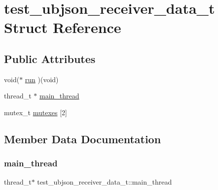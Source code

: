 \hypertarget{structtest__ubjson__receiver__data__t}{}\section{test\+\_\+ubjson\+\_\+receiver\+\_\+data\+\_\+t Struct Reference}
\label{structtest__ubjson__receiver__data__t}
\subsection*{Public Attributes}
\begin{DoxyCompactItemize}
\item 
void($\ast$ \hyperlink{structtest__ubjson__receiver__data__t_a1a3ef4a864252ac9b0485afcb286e4c7}{run} )(void)
\item 
thread\+\_\+t $\ast$ \hyperlink{structtest__ubjson__receiver__data__t_a1554e73b10f470c7b2b25229b2163dde}{main\+\_\+thread}
\item 
mutex\+\_\+t \hyperlink{structtest__ubjson__receiver__data__t_af77dba511e45415e0749eae12278c87e}{mutexes} \mbox{[}2\mbox{]}
\end{DoxyCompactItemize}


\subsection{Member Data Documentation}
\mbox{\label{structtest__ubjson__receiver__data__t_a1554e73b10f470c7b2b25229b2163dde}} 
\subsubsection{\texorpdfstring{main\+\_\+thread}{main\_thread}}
{\footnotesize\ttfamily thread\+\_\+t$\ast$ test\+\_\+ubjson\+\_\+receiver\+\_\+data\+\_\+t\+::main\+\_\+thread}

\mbox{\label{structtest__ubjson__receiver__data__t_af77dba511e45415e0749eae12278c87e}} 
